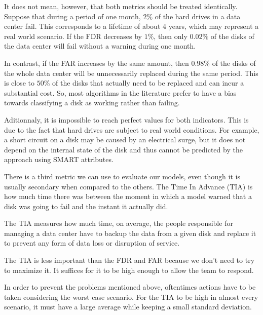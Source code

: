 It does not mean, however, that both metrics should be treated identically.
Suppose that during a period of one month, $2\%$ of the hard drives in a data center fail.
This corresponds to a lifetime of about 4 years, which may represent a real world scenario.
If the FDR decreases by $1\%$, then only $0.02\%$ of the disks of the data center will fail without a warning during one month.

In contrast, if the FAR increases by the same amount, then $0.98\%$ of the disks of the whole data center will be unnecessarily replaced during the same period.
This is close to $50\%$ of the disks that actually need to be replaced and can incur a substantial cost.
So, most algorithms in the literature prefer to have a bias towards classifying a disk as working rather than failing.

Aditionnaly, it is impossible to reach perfect values for both indicators.
This is due to the fact that hard drives are subject to real world conditions.
For example, a short circuit on a disk may be caused by an electrical surge, but it does not depend on the internal state of the disk and thus cannot be predicted by the approach using SMART attributes.

There is a third metric we can use to evaluate our models, even though it is usually secondary when compared to the others.
The Time In Advance (TIA) is how much time there was between the moment in which a model warned that a disk was going to fail and the instant it actually did.

The TIA measures how much time, on average, the people responsible for managing a data center have to backup the data from a given disk and replace it to prevent any form of data loss or disruption of service.

The TIA is less important than the FDR and FAR because we don't need to try to maximize it.
It suffices for it to be high enough to allow the team to respond.

In order to prevent the problems mentioned above, oftentimes actions have to be taken considering the worst case scenario.
For the TIA to be high in almost every scenario, it must have a large average while keeping a small standard deviation.


